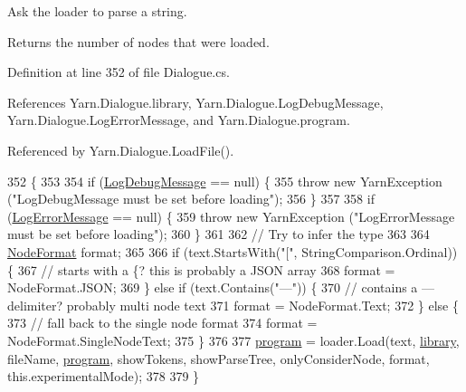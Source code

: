 Ask the loader to parse a string. 

Returns the number of nodes that were loaded. 

Definition at line 352 of file Dialogue.\-cs.



References Yarn.\-Dialogue.\-library, Yarn.\-Dialogue.\-Log\-Debug\-Message, Yarn.\-Dialogue.\-Log\-Error\-Message, and Yarn.\-Dialogue.\-program.



Referenced by Yarn.\-Dialogue.\-Load\-File().


\begin{DoxyCode}
352                                                                                                            
                                                 \{
353 
354             \textcolor{keywordflow}{if} (\hyperlink{a00094_a381f48bb0fbb294f8cf44ca57f11be31}{LogDebugMessage} == null) \{
355                 \textcolor{keywordflow}{throw} \textcolor{keyword}{new} YarnException (\textcolor{stringliteral}{"LogDebugMessage must be set before loading"});
356             \}
357 
358             \textcolor{keywordflow}{if} (\hyperlink{a00094_a9801e83dd044d6498fdf6ebcc6bec5ac}{LogErrorMessage} == null) \{
359                 \textcolor{keywordflow}{throw} \textcolor{keyword}{new} YarnException (\textcolor{stringliteral}{"LogErrorMessage must be set before loading"});
360             \}
361 
362             \textcolor{comment}{// Try to infer the type}
363 
364             \hyperlink{a00053_ad7ebb46e7309ead8767383a672b3272f}{NodeFormat} format;
365 
366             \textcolor{keywordflow}{if} (text.StartsWith(\textcolor{stringliteral}{"["}, StringComparison.Ordinal)) \{
367                 \textcolor{comment}{// starts with a \{? this is probably a JSON array}
368                 format = NodeFormat.JSON;
369             \} \textcolor{keywordflow}{else} \textcolor{keywordflow}{if} (text.Contains(\textcolor{stringliteral}{"---"})) \{
370                 \textcolor{comment}{// contains a --- delimiter? probably multi node text}
371                 format = NodeFormat.Text;
372             \} \textcolor{keywordflow}{else} \{
373                 \textcolor{comment}{// fall back to the single node format}
374                 format = NodeFormat.SingleNodeText;
375             \}
376 
377             \hyperlink{a00094_a0a1cca92325f430425d784d416cb5c2b}{program} = loader.Load(text, \hyperlink{a00094_ae660d4cfb6e296358d2f61d8ee74c66a}{library}, fileName, \hyperlink{a00094_a0a1cca92325f430425d784d416cb5c2b}{program}, showTokens, 
      showParseTree, onlyConsiderNode, format, this.experimentalMode);
378 
379         \}
\end{DoxyCode}


